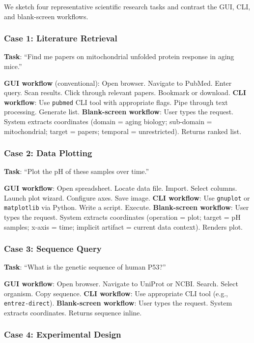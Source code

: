 \documentclass[11pt,a4paper]{article}
\theoremstyle{definition}
\theoremstyle{remark}
\begin{document}
We sketch four representative scientific research tasks and contrast the GUI, CLI, and blank-screen workflows.

\subsubsection{Case 1: Literature Retrieval}

\textbf{Task}: ``Find me papers on mitochondrial unfolded protein response in aging mice.''

\textbf{GUI workflow} (conventional): Open browser. Navigate to PubMed. Enter query. Scan results. Click through relevant papers. Bookmark or download.
\textbf{CLI workflow}: Use \texttt{pubmed} CLI tool with appropriate flags. Pipe through text processing. Generate list.
\textbf{Blank-screen workflow}: User types the request. System extracts coordinates (domain = aging biology; sub-domain = mitochondrial; target = papers; temporal = unrestricted). Returns ranked list.

\subsubsection{Case 2: Data Plotting}

\textbf{Task}: ``Plot the pH of these samples over time.''

\textbf{GUI workflow}: Open spreadsheet. Locate data file. Import. Select columns. Launch plot wizard. Configure axes. Save image.
\textbf{CLI workflow}: Use \texttt{gnuplot} or \texttt{matplotlib} via Python. Write a script. Execute.
\textbf{Blank-screen workflow}: User types the request. System extracts coordinates (operation = plot; target = pH samples; x-axis = time; implicit artifact = current data context). Renders plot.

\subsubsection{Case 3: Sequence Query}

\textbf{Task}: ``What is the genetic sequence of human P53?''

\textbf{GUI workflow}: Open browser. Navigate to UniProt or NCBI. Search. Select organism. Copy sequence.
\textbf{CLI workflow}: Use appropriate CLI tool (e.g., \texttt{entrez-direct}).
\textbf{Blank-screen workflow}: User types the request. System extracts coordinates. Returns sequence inline.

\subsubsection{Case 4: Experimental Design}
\end{document}
